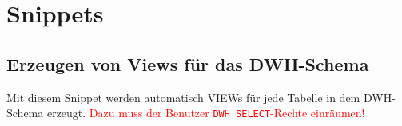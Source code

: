 \appendix
\section{Snippets}
\label{sec:snippets}

\subsection{Erzeugen von Views für das DWH-Schema}
\label{sec:snippets.dwh-views}
Mit diesem Snippet werden automatisch VIEWs für jede Tabelle in dem DWH-Schema erzeugt. \textcolor{red}{Dazu muss der Benutzer \texttt{DWH SELECT}-Rechte einräumen!}

